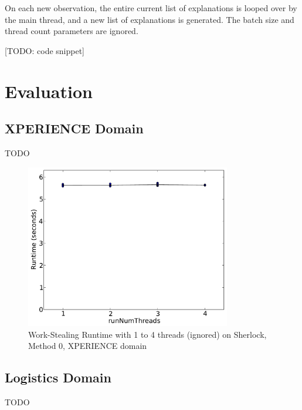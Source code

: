 \documentclass[12pt,twoside,abbrevs,msc,ai,notimes,logo,sansheadings]{infthesis}
\begin{document}
  On each new observation, the entire current list of explanations is looped over by the main thread, and a new list of explanations is generated. The batch size and thread count parameters are ignored.
  
  [TODO: code snippet]
  
  \section{Evaluation}
  
  \subsection{XPERIENCE Domain}
  TODO
  
  \begin{figure}[!htbp]
  \begin{centering}
  \includegraphics[width=0.8\textwidth]{images/threads-xper5-sherlock-0-1}
  \par\end{centering}
  \caption{Work-Stealing Runtime with 1 to 4 threads (ignored) on Sherlock, Method 0, XPERIENCE domain}
  \end{figure}
  
  \subsection{Logistics Domain}
  TODO
  
\end{document}

